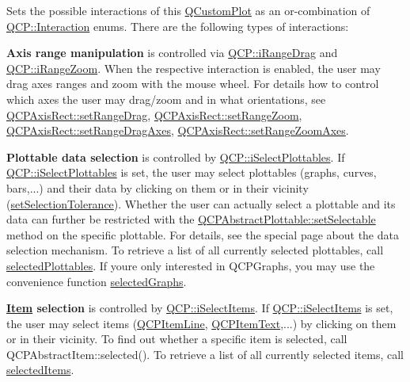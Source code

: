 Sets the possible interactions of this \hyperlink{class_q_custom_plot}{Q\+Custom\+Plot} as an or-\/combination of \hyperlink{namespace_q_c_p_a2ad6bb6281c7c2d593d4277b44c2b037}{Q\+C\+P\+::\+Interaction} enums. There are the following types of interactions\+:

{\bfseries Axis range manipulation} is controlled via \hyperlink{namespace_q_c_p_a2ad6bb6281c7c2d593d4277b44c2b037a15aab687b04f7ecf86506102b41b0900}{Q\+C\+P\+::i\+Range\+Drag} and \hyperlink{namespace_q_c_p_a2ad6bb6281c7c2d593d4277b44c2b037ae91a9794d8323fe08229dda97d2c17a0}{Q\+C\+P\+::i\+Range\+Zoom}. When the respective interaction is enabled, the user may drag axes ranges and zoom with the mouse wheel. For details how to control which axes the user may drag/zoom and in what orientations, see \hyperlink{class_q_c_p_axis_rect_ae6aef2f7211ba6097c925dcd26008418}{Q\+C\+P\+Axis\+Rect\+::set\+Range\+Drag}, \hyperlink{class_q_c_p_axis_rect_a7960a9d222f1c31d558b064b60f86a31}{Q\+C\+P\+Axis\+Rect\+::set\+Range\+Zoom}, \hyperlink{class_q_c_p_axis_rect_a648cce336bd99daac4a5ca3e5743775d}{Q\+C\+P\+Axis\+Rect\+::set\+Range\+Drag\+Axes}, \hyperlink{class_q_c_p_axis_rect_a9442cca2aa358405f39a64d51eca13d2}{Q\+C\+P\+Axis\+Rect\+::set\+Range\+Zoom\+Axes}.

{\bfseries Plottable data selection} is controlled by \hyperlink{namespace_q_c_p_a2ad6bb6281c7c2d593d4277b44c2b037ab4ac8dbba56ed6ef7d1355895707d6a5}{Q\+C\+P\+::i\+Select\+Plottables}. If \hyperlink{namespace_q_c_p_a2ad6bb6281c7c2d593d4277b44c2b037ab4ac8dbba56ed6ef7d1355895707d6a5}{Q\+C\+P\+::i\+Select\+Plottables} is set, the user may select plottables (graphs, curves, bars,...) and their data by clicking on them or in their vicinity (\hyperlink{class_q_custom_plot_a4dc31241d7b09680950e19e5f971ed93}{set\+Selection\+Tolerance}). Whether the user can actually select a plottable and its data can further be restricted with the \hyperlink{class_q_c_p_abstract_plottable_ac238d6e910f976f1f30d41c2bca44ac3}{Q\+C\+P\+Abstract\+Plottable\+::set\+Selectable} method on the specific plottable. For details, see the special page about the data selection mechanism. To retrieve a list of all currently selected plottables, call \hyperlink{class_q_custom_plot_a747faaab57c56891e901a1e97fa4359a}{selected\+Plottables}. If you\textquotesingle{}re only interested in Q\+C\+P\+Graphs, you may use the convenience function \hyperlink{class_q_custom_plot_ad3547aded026d8a9ae6ef13a69080d06}{selected\+Graphs}.

{\bfseries \hyperlink{class_item}{Item} selection} is controlled by \hyperlink{namespace_q_c_p_a2ad6bb6281c7c2d593d4277b44c2b037a271679ebb13ab4a6b4c2c2d9459f1de8}{Q\+C\+P\+::i\+Select\+Items}. If \hyperlink{namespace_q_c_p_a2ad6bb6281c7c2d593d4277b44c2b037a271679ebb13ab4a6b4c2c2d9459f1de8}{Q\+C\+P\+::i\+Select\+Items} is set, the user may select items (\hyperlink{class_q_c_p_item_line}{Q\+C\+P\+Item\+Line}, \hyperlink{class_q_c_p_item_text}{Q\+C\+P\+Item\+Text},...) by clicking on them or in their vicinity. To find out whether a specific item is selected, call Q\+C\+P\+Abstract\+Item\+::selected(). To retrieve a list of all currently selected items, call \hyperlink{class_q_custom_plot_afda487bcf2d6cf1a57173d82495e29ba}{selected\+Items}.


